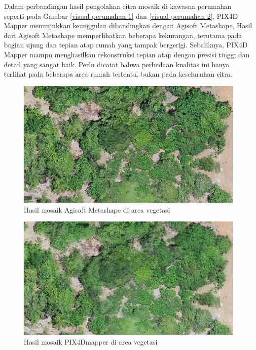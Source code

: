 Dalam perbandingan hasil pengolahan citra mosaik di kawasan perumahan seperti pada Gambar \ref{visual perumahan 1} dan \ref{visual perumahan 2}, PIX4D Mapper menunjukkan keunggulan dibandingkan dengan Agisoft Metashape. Hasil dari Agisoft Metashape memperlihatkan beberapa kekurangan, terutama pada bagian ujung dan tepian atap rumah yang tampak bergerigi. Sebaliknya, PIX4D Mapper mampu menghasilkan rekonstruksi tepian atap dengan presisi tinggi dan detail yang sangat baik. Perlu dicatat bahwa perbedaan kualitas ini hanya terlihat pada beberapa area rumah tertentu, bukan pada keseluruhan citra.


\begin{figure} [H]
    \centering
    \includegraphics [width=1\linewidth]{image/agisoft vegetasi.png}
    \caption{Hasil mosaik Agisoft Metashape di area vegetasi}
    \label{visual vegetasi 1}
\end{figure}

\begin{figure} [H]
    \centering
    \includegraphics [width=1\linewidth]{image/pix vegetasi.png}
    \caption{Hasil mosaik PIX4Dmapper di area vegetasi}
    \label{visual vegetasi 2}
\end{figure}

